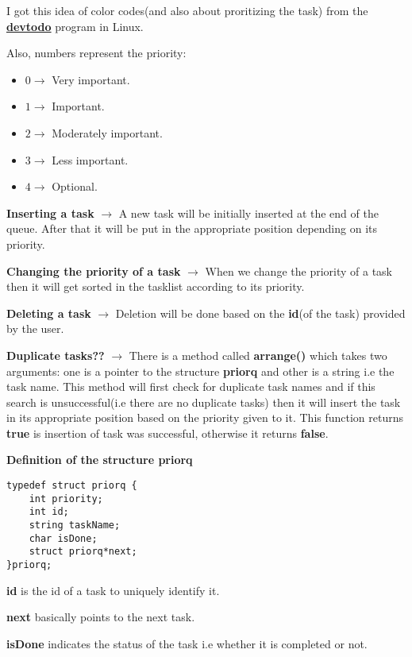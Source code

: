 \documentclass{article}
\begin{document}
I got this idea of color codes(and also about proritizing the task) from the \href{https://www.mankier.com/1/devtodo}{\textbf{devtodo}} program in Linux.

\newpage
Also, numbers represent the priority:
\begin{itemize}
	\item $0 \rightarrow$ Very important.
	\item $1 \rightarrow$ Important.
	\item $2 \rightarrow$ Moderately important.
	\item $3 \rightarrow$ Less important.
	\item $4 \rightarrow$ Optional.
\end{itemize}

\textbf{Inserting a task} $\rightarrow$ A new task will be initially inserted at the end of the queue. After that it will be put in the appropriate position depending on its priority.

\textbf{Changing the priority of a task} $\rightarrow$ When we change the priority of a task then it will get sorted in the tasklist according to its priority.

\textbf{Deleting a task} $\rightarrow$ Deletion will be done based on the \textbf{id}(of the task) provided by the user.

\textbf{Duplicate tasks??} $\rightarrow$ There is a method called \textbf{arrange()} which takes two arguments: one is a pointer to the structure \textbf{priorq} and other is a string i.e the task name. This method will first check for duplicate task names and if this search is unsuccessful(i.e there are no duplicate tasks) then it will insert the task in its appropriate position based on the priority given to it. This function returns \textbf{true} is insertion of task was successful, otherwise it returns \textbf{false}.

\textbf{Definition of the structure \textbf{priorq}}
\begin{lstlisting}[frame=single, breaklines=true]
typedef struct priorq {
	int priority;
	int id;
	string taskName;
	char isDone;
	struct priorq*next;
}priorq;
\end{lstlisting}

\textbf{id} is the id of a task to uniquely identify it.

\vspace{5pt}
\textbf{next} basically points to the next task.

\vspace{5pt}
\textbf{isDone} indicates the status of the task i.e whether it is completed or not.
\newpage
\end{document}
